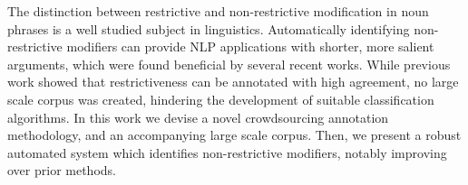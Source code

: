 The distinction between restrictive and non-restrictive modification in noun phrases is a well studied subject in linguistics. Automatically identifying non-restrictive modifiers can provide NLP applications with shorter, more salient arguments, which were found beneficial by several recent works. While previous work showed that restrictiveness can be annotated with high agreement, no large scale corpus was created, hindering the development of suitable classification algorithms. In this work we devise a novel crowdsourcing annotation methodology, and an accompanying large scale corpus. Then, we present a robust automated system which identifies non-restrictive modifiers, notably improving over prior methods.
